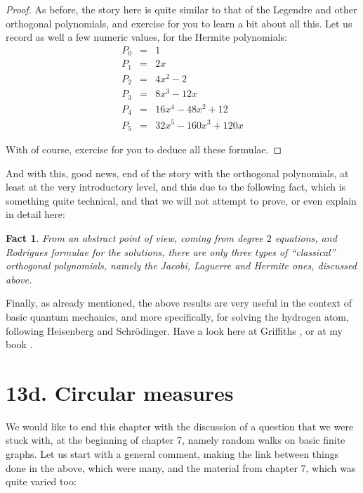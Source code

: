 \documentclass[12pt]{amsbook}
\newtheorem{fact}[theorem]{Fact}
\begin{document}
\begin{proof}
As before, the story here is quite similar to that of the Legendre and other orthogonal polynomials, and exercise for you to learn a bit about all this. Let us record as well a few numeric values, for the Hermite polynomials:
\begin{eqnarray*}
P_0&=&1\\
P_1&=&2x\\
P_2&=&4x^2-2\\
P_3&=&8x^3-12x\\
P_4&=&16x^4-48x^2+12\\
P_5&=&32x^5-160x^3+120x
\end{eqnarray*}

With of course, exercise for you to deduce all these formulae.
\end{proof}

And with this, good news, end of the story with the orthogonal polynomials, at least at the very introductory level, and this due to the following fact, which is something quite technical, and that we will not attempt to prove, or even explain in detail here:

\begin{fact}
From an abstract point of view, coming from degree $2$ equations, and Rodrigues formulae for the solutions, there are only three types of ``classical'' orthogonal polynomials, namely the Jacobi, Laguerre and Hermite ones, discussed above.
\end{fact}

Finally, as already mentioned, the above results are very useful in the context of basic quantum mechanics, and more specifically, for solving the hydrogen atom, following Heisenberg and Schr\"odinger. Have a look here at Griffiths \cite{gri}, or at my book \cite{ba3}.

\section*{13d. Circular measures}

We would like to end this chapter with the discussion of a question that we were stuck with, at the beginning of chapter 7, namely random walks on basic finite graphs. Let us start with a general comment, making the link between things done in the above, which were many, and the material from chapter 7, which was quite varied too:
\end{document}
